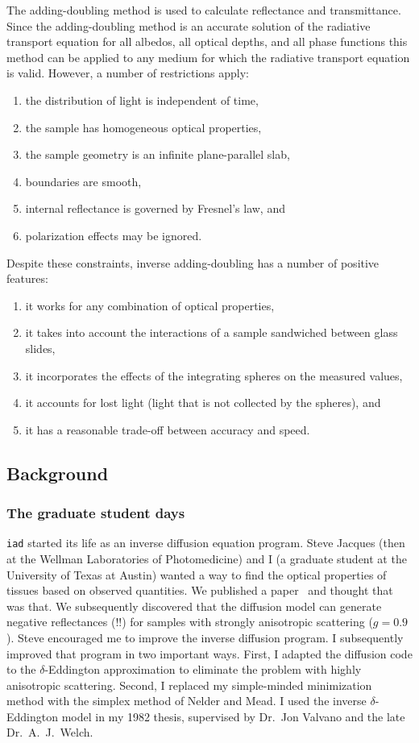 \documentclass{article}
\newcommand\iadprog{\texttt{iad}}
\begin{document}
The adding-doubling method is used to calculate reflectance and transmittance.
Since the adding-doubling method is an accurate solution of the radiative
transport equation for all albedos, all optical depths, and all phase functions
this method can be applied to any medium for which the radiative transport
equation is valid.  However, a number of restrictions apply:
\begin{enumerate}
\item
the distribution of light is independent of time,
\item
the sample has homogeneous optical properties,
\item
the sample geometry is an infinite plane-parallel slab,
\item
boundaries are smooth,
\item
internal reflectance is governed by Fresnel's law, and
\item
polarization effects may be ignored.
\end{enumerate}
Despite these constraints, inverse adding-doubling has a number of positive features:
\begin{enumerate}
\item
it works for any combination of optical properties,
\item
it takes into account the interactions of a sample sandwiched between glass slides,
\item
it incorporates the effects of the integrating spheres on the measured values,
\item
it accounts for lost light (light that is not collected by the spheres), and
\item
it has a reasonable trade-off between accuracy and speed.
\end{enumerate}

\subsection{Background}

\subsubsection*{The graduate student days}
\iadprog{} started its life as an inverse diffusion equation program. Steve Jacques (then at the Wellman
Laboratories of Photomedicine) and I (a graduate student at the University of Texas at
Austin) wanted a way to find the optical properties of tissues based on observed quantities. We published a 
paper~\cite{jacques87a} and thought that was that.  We subsequently discovered that
the diffusion model can generate negative reflectances (!!) for samples with strongly
anisotropic scattering ($g=0.9$).  Steve encouraged me to improve the inverse diffusion
program.  I subsequently improved that program in two important ways.  First, I
adapted the diffusion code to the $\delta$-Eddington approximation to eliminate the problem with highly
anisotropic scattering. Second, I replaced my simple-minded minimization method with the
simplex method of Nelder and Mead.  I used the inverse $\delta$-Eddington
model in my 1982 thesis, supervised by Dr.\ Jon Valvano and the late Dr.\ A.\ J.\ Welch.
\end{document}
